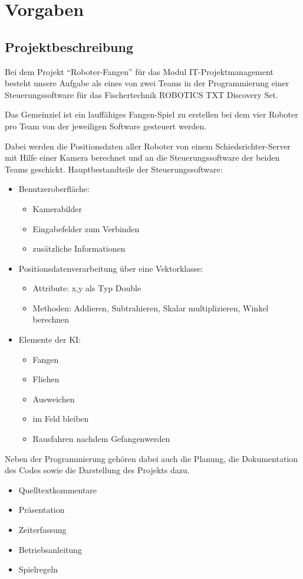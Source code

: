 \section{Vorgaben}
\subsection{Projektbeschreibung}

Bei dem Projekt "`Roboter-Fangen"' für das Modul IT-Projektmanagement besteht unsere Aufgabe als eines von zwei Teams in der Programmierung einer Steuerungssoftware für das Fischertechnik ROBOTICS TXT Discovery Set.

Das Gemeinziel ist ein lauffähiges Fangen-Spiel zu erstellen bei dem vier Roboter pro Team von der jeweiligen Software gesteuert werden.

Dabei werden die Positionsdaten aller Roboter von einem Schiedsrichter-Server mit Hilfe einer Kamera berechnet und an die Steuerungssoftware der beiden Teams geschickt.
Hauptbestandteile der Steuerungssoftware:
\begin{itemize}
	\item Benutzeroberfläche:
	\begin{itemize}
		\item Kamerabilder
		\item Eingabefelder zum Verbinden
		\item zusätzliche Informationen
	\end{itemize}
	\item Positionsdatenverarbeitung über eine Vektorklasse:
	\begin{itemize}
		\item Attribute: x,y als Typ Double
		\item Methoden: Addieren, Subtrahieren, Skalar multiplizieren, Winkel berechnen
	\end{itemize}
	\item Elemente der KI:
	\begin{itemize}
		\item Fangen
		\item Fliehen
		\item Ausweichen
		\item im Feld bleiben
		\item Rausfahren nachdem Gefangenwerden\\
	\end{itemize}
\end{itemize}
Neben der Programmierung gehören dabei auch die Planung, die Dokumentation des Codes sowie die Darstellung des Projekts dazu.
\begin{itemize}
	\item Quelltextkommentare
	\item Präsentation
	\item Zeiterfassung
	\item Betriebsanleitung
	\item Spielregeln
\end{itemize}
